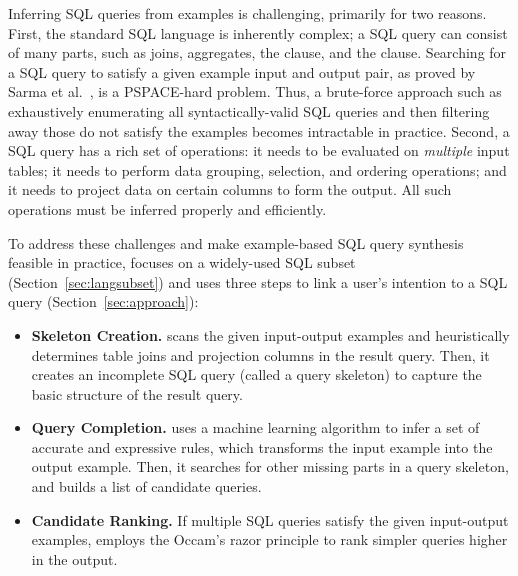Inferring SQL queries from examples is challenging,
primarily for two reasons. First, the standard SQL
language is inherently complex; a SQL query can consist
of many parts, such as joins, aggregates,
the  clause, and the  clause.
Searching for a SQL query
to satisfy a given example input and output pair,
as proved by Sarma et al.~\cite{DasSarma:2010},
is a PSPACE-hard problem. Thus,
a brute-force approach such as exhaustively
enumerating all
syntactically-valid SQL queries and then
filtering away those do not satisfy the examples
becomes intractable in practice. 
Second, a SQL query has a rich set of operations: it
needs to be evaluated on \textit{multiple} input tables;
it needs to perform data grouping, selection, and ordering
operations; and it needs to project data on certain columns to
form the output.
All such operations must be inferred properly and efficiently.%


To address these challenges and make example-based
SQL query synthesis feasible in practice,
\ourtool focuses on a widely-used SQL subset (Section~\ref{sec:langsubset})
and uses three steps to link a user's intention to
a SQL query (Section~\ref{sec:approach}):



\begin{itemize}
\vspace{-1mm}
\item \textbf{Skeleton Creation.} \ourtool scans the
given input-output examples and heuristically
determines table joins and projection columns in
the result query. Then, it creates an
incomplete SQL query (called a query skeleton) to
capture the basic structure of the result query.

\item \textbf{Query Completion.} \ourtool
uses a machine learning algorithm to infer a set of accurate
and expressive rules, which transforms the input
example into the output example. Then, it
searches for other missing parts in a query skeleton,
and builds a list of candidate queries. 


\item \textbf{Candidate Ranking.} If multiple SQL
queries satisfy the given input-output examples,
\ourtool employs the Occam's razor principle to
rank simpler queries higher in the output.
\end{itemize}

